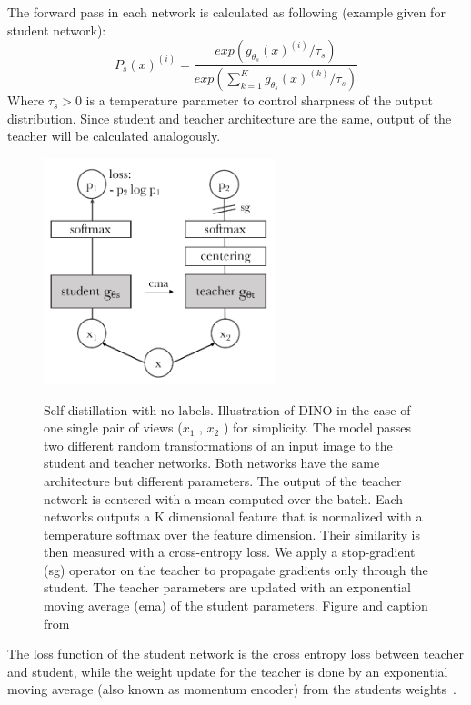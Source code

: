 The forward pass in each network is calculated as following (example given for student network):
\begin{equation}
    P_s(x)^{(i)} = \frac{exp(g_{\theta_s}(x)^{(i)} / \tau_s)}{exp(\sum^K_{k=1}g_{\theta_s}(x)^{(k)} / \tau_s)}
    \label{eq:forward-pass}
\end{equation}
Where $\tau_s > 0$ is a temperature parameter to control sharpness of the output distribution.
Since student and teacher architecture are the same, output of the teacher will be calculated analogously.

\begin{figure}[!t]
    \centering
    \includegraphics[width=0.6\textwidth]{pictures/dino-structure}\\
    \caption[Structure of DINO]{Self-distillation with no labels. Illustration of DINO in the case of one single pair of views ($x_1$ , $x_2$ ) for simplicity. The model passes two different random transformations of an input image to the student and teacher networks. Both networks have the same architecture but different parameters. The output of the teacher network is centered with a mean computed over the batch. Each networks outputs a K dimensional feature that is normalized with a temperature softmax over the feature dimension. Their similarity is then measured with a cross-entropy loss. We apply a stop-gradient (sg) operator on the teacher to propagate gradients only through the student. The teacher parameters are updated with an exponential moving average (ema) of the student parameters. Figure and caption from~\autocite{Caron2021}}
    \label{fig:dino-structure}
\end{figure}

The loss function of the student network is the cross entropy loss between teacher and student, while the weight update for the teacher is done by an exponential moving average (also known as momentum encoder) from the students weights~\autocite{Caron2021}.

